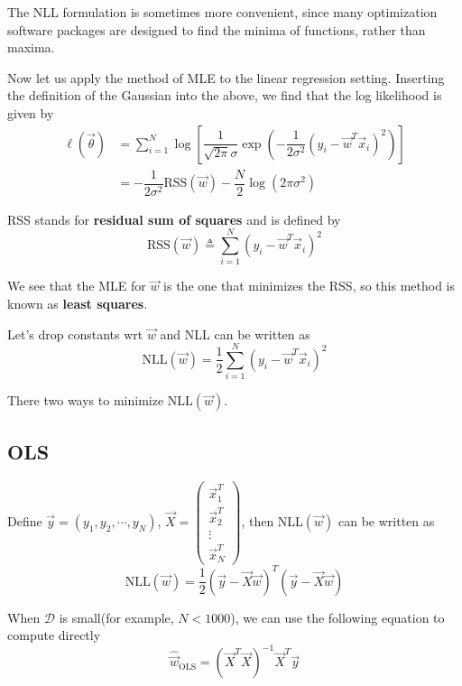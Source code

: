 The NLL formulation is sometimes more convenient, since many optimization software packages are designed to find the minima of functions, rather than maxima.

Now let us apply the method of MLE to the linear regression setting. Inserting the definition of the Gaussian into the above, we find that the log likelihood is given by
\begin{align}
\ell(\vec{\theta})& =\sum\limits_{i=1}^N \log\left[\dfrac{1}{\sqrt{2\pi}\sigma}\exp\left(-\dfrac{1}{2\sigma^2}(y_i-\vec{w}^T\vec{x}_i)^2\right)\right] \\
     & =-\dfrac{1}{2\sigma^2}\text{RSS}(\vec{w})-\dfrac{N}{2}\log(2\pi\sigma^2)
\end{align}

RSS stands for \textbf{residual sum of squares} and is defined by
\begin{equation}
\text{RSS}(\vec{w}) \triangleq \sum\limits_{i=1}^N (y_i-\vec{w}^T\vec{x}_i)^2
\end{equation}

We see that the MLE for $\vec{w}$ is the one that minimizes the RSS, so this method is known as \textbf{least squares}.

Let's drop constants wrt $\vec{w}$ and NLL can be written as
\begin{equation}
\text{NLL}(\vec{w}) = \dfrac{1}{2}\sum\limits_{i=1}^N (y_i-\vec{w}^T\vec{x}_i)^2
\end{equation}

There two ways to minimize NLL$(\vec{w})$.


\subsection{OLS}
Define $\vec{y}=(y_1,y_2,\cdots,y_N)$, $\vec{X}=\left(\begin{array}{c}\vec{x}_1^T \\ \vec{x}_2^T \\ \vdots \\ \vec{x}_N^T\end{array}\right)$, then NLL$(\vec{w})$ can be written as
\begin{equation}
\text{NLL}(\vec{w})=\dfrac{1}{2}(\vec{y}-\vec{X}\vec{w})^T(\vec{y}-\vec{X}\vec{w})
\end{equation}

When $\mathcal{D}$ is small(for example, $N < 1000$), we can use the following equation to compute  directly
\begin{equation}
\hat{\vec{w}}_{\mathrm{OLS}}=(\vec{X}^T\vec{X})^{-1}\vec{X}^T\vec{y}
\end{equation}


